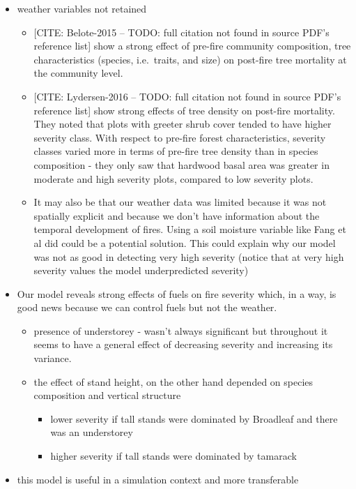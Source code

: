 \documentclass[
  numafflabel,
  authoryear,
  preprint]{elsarticle}
\providecommand{\tightlist}{%
  \setlength{\itemsep}{0pt}\setlength{\parskip}{0pt}}
\begin{document}
\begin{itemize}
\tightlist
\item
  weather variables not retained

  \begin{itemize}
  \tightlist
  \item
    {[}CITE: Belote-2015 -- TODO: full citation not found in source
    PDF's reference list{]} show a strong effect of pre-fire community
    composition, tree characteristics (species, i.e.~traits, and size)
    on post-fire tree mortality at the community level.
  \item
    {[}CITE: Lydersen-2016 -- TODO: full citation not found in source
    PDF's reference list{]} show strong effects of tree density on
    post-fire mortality. They noted that plots with greeter shrub cover
    tended to have higher severity class. With respect to pre-fire
    forest characteristics, severity classes varied more in terms of
    pre-fire tree density than in species composition - they only saw
    that hardwood basal area was greater in moderate and high severity
    plots, compared to low severity plots.
  \item
    It may also be that our weather data was limited because it was not
    spatially explicit and because we don't have information about the
    temporal development of fires. Using a soil moisture variable like
    Fang et al did could be a potential solution. This could explain why
    our model was not as good in detecting very high severity (notice
    that at very high severity values the model underpredicted severity)
  \end{itemize}
\item
  Our model reveals strong effects of fuels on fire severity which, in a
  way, is good news because we can control fuels but not the weather.

  \begin{itemize}
  \tightlist
  \item
    presence of understorey - wasn't always significant but throughout
    it seems to have a general effect of decreasing severity and
    increasing its variance.
  \item
    the effect of stand height, on the other hand depended on species
    composition and vertical structure

    \begin{itemize}
    \tightlist
    \item
      lower severity if tall stands were dominated by Broadleaf and
      there was an understorey
    \item
      higher severity if tall stands were dominated by tamarack
    \end{itemize}
  \end{itemize}
\item
  this model is useful in a simulation context and more transferable


\end{itemize}
\end{document}

